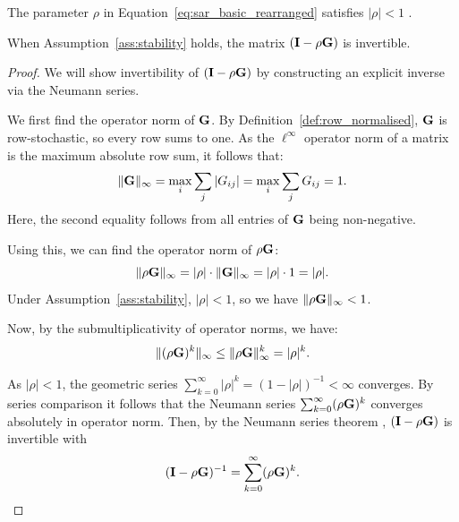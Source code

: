 \begin{assumption}
\label{ass:stability}
The parameter $\rho$ in Equation~\eqref{eq:sar_basic_rearranged} satisfies $|\rho| < 1$ \parencite[Eq.~(1.12), p.~14; also Eq.~(3.6), p.~47]{LeSage2009}.
\end{assumption}

\begin{proposition}[Invertibility]
\label{prop:invertibility}
When Assumption~\ref{ass:stability} holds, the matrix $(\mathbf{I} - \rho\mathbf{G})$ is invertible.
\end{proposition}

\begin{proof}
We will show invertibility of $(\mathbf{I} - \rho\mathbf{G})$ by constructing an explicit inverse via the Neumann series.

We first find the operator norm of $\mathbf{G}$. By Definition~\ref{def:row_normalised}, $\mathbf{G}$ is row-stochastic, so every row sums to one. As the $\ell^\infty$ operator norm of a matrix is the maximum absolute row sum, it follows that:
\begin{equation*}
    \|\mathbf{G}\|_\infty = \max_i \sum_j |G_{ij}| = \max_i \sum_j G_{ij} = 1.
\end{equation*}
Here, the second equality follows from all entries of $\mathbf{G}$ being non-negative.

Using this, we can find the operator norm of $\rho\mathbf{G}$:
\begin{equation*}
    \|\rho\mathbf{G}\|_\infty = |\rho| \cdot \|\mathbf{G}\|_\infty = |\rho| \cdot 1 = |\rho|.
\end{equation*}
Under Assumption~\ref{ass:stability}, $|\rho| < 1$, so we have $\|\rho\mathbf{G}\|_\infty < 1$.

Now, by the submultiplicativity of operator norms, we have:
\begin{equation*}
    \|(\rho\mathbf{G})^k\|_\infty \leq \|\rho\mathbf{G}\|_\infty^k = |\rho|^k.
\end{equation*}

As $|\rho| < 1$, the geometric series $\sum_{k=0}^{\infty} |\rho|^k = (1 - |\rho|)^{-1} < \infty$ converges. By series comparison it follows that the Neumann series $\sum_{k=0}^{\infty} (\rho\mathbf{G})^k$ converges absolutely in operator norm. Then, by the Neumann series theorem \parencite[Lemma~2.3.3, p.~74]{GolubVanLoan2013}, $(\mathbf{I} - \rho\mathbf{G})$ is invertible with
\begin{equation*}
    (\mathbf{I} - \rho\mathbf{G})^{-1} = \sum_{k=0}^{\infty} (\rho\mathbf{G})^k. \qedhere
\end{equation*}
\end{proof}

